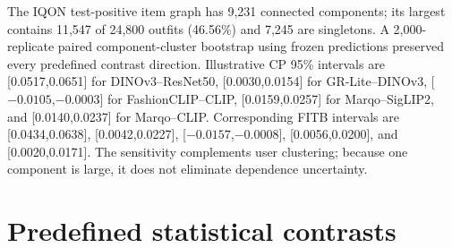 \documentclass[preprint,12pt]{elsarticle}
\begin{document}
The IQON test-positive item graph has 9,231 connected components; its largest contains 11,547 of 24,800 outfits (46.56\%) and 7,245 are singletons. A 2,000-replicate paired component-cluster bootstrap using frozen predictions preserved every predefined contrast direction. Illustrative CP 95\% intervals are [0.0517,0.0651] for DINOv3--ResNet50, [0.0030,0.0154] for GR-Lite--DINOv3, [$-0.0105$,$-0.0003$] for FashionCLIP--CLIP, [0.0159,0.0257] for Marqo--SigLIP2, and [0.0140,0.0237] for Marqo--CLIP. Corresponding FITB intervals are [0.0434,0.0638], [0.0042,0.0227], [$-0.0157$,$-0.0008$], [0.0056,0.0200], and [0.0020,0.0171]. The sensitivity complements user clustering; because one component is large, it does not eliminate dependence uncertainty.

\section{Predefined statistical contrasts}
\end{document}
